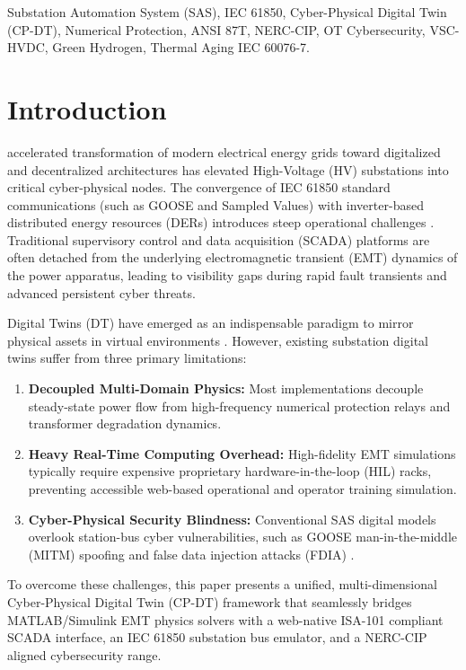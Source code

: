\documentclass[journal]{IEEEtran}
\begin{document}
\begin{IEEEkeywords}
Substation Automation System (SAS), IEC 61850, Cyber-Physical Digital Twin (CP-DT), Numerical Protection, ANSI 87T, NERC-CIP, OT Cybersecurity, VSC-HVDC, Green Hydrogen, Thermal Aging IEC 60076-7.
\end{IEEEkeywords}

\section{Introduction}
 accelerated transformation of modern electrical energy grids toward digitalized and decentralized architectures has elevated High-Voltage (HV) substations into critical cyber-physical nodes. The convergence of IEC 61850 standard communications (such as GOOSE and Sampled Values) with inverter-based distributed energy resources (DERs) introduces steep operational challenges \cite{iec61850_general}. Traditional supervisory control and data acquisition (SCADA) platforms are often detached from the underlying electromagnetic transient (EMT) dynamics of the power apparatus, leading to visibility gaps during rapid fault transients and advanced persistent cyber threats.

Digital Twins (DT) have emerged as an indispensable paradigm to mirror physical assets in virtual environments \cite{digital_twin_power_grid}. However, existing substation digital twins suffer from three primary limitations:
\begin{enumerate}
    \item \textbf{Decoupled Multi-Domain Physics:} Most implementations decouple steady-state power flow from high-frequency numerical protection relays and transformer degradation dynamics.
    \item \textbf{Heavy Real-Time Computing Overhead:} High-fidelity EMT simulations typically require expensive proprietary hardware-in-the-loop (HIL) racks, preventing accessible web-based operational and operator training simulation.
    \item \textbf{Cyber-Physical Security Blindness:} Conventional SAS digital models overlook station-bus cyber vulnerabilities, such as GOOSE man-in-the-middle (MITM) spoofing and false data injection attacks (FDIA) \cite{goose_cyber_security}.
\end{enumerate}

To overcome these challenges, this paper presents a unified, multi-dimensional Cyber-Physical Digital Twin (CP-DT) framework that seamlessly bridges MATLAB/Simulink EMT physics solvers with a web-native ISA-101 compliant SCADA interface, an IEC 61850 substation bus emulator, and a NERC-CIP aligned cybersecurity range.
\end{document}

